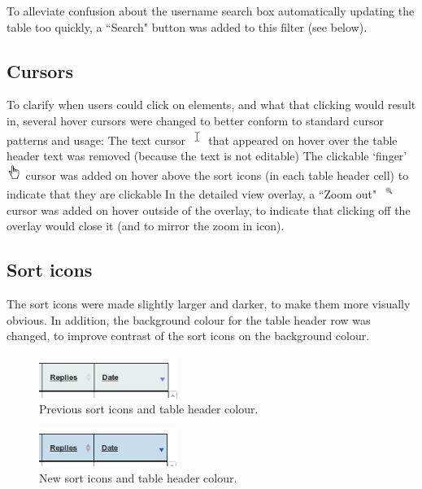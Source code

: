 To alleviate confusion about the username search box automatically updating the table too quickly, a ``Search" button was added to this filter (see below). 

\subsection{Cursors}
To clarify when users could click on elements, and what that clicking would result in, several hover cursors were changed to better conform to standard cursor patterns and usage:
The text cursor \includegraphics[width=0.5cm]{Figures/textcursor.png} that appeared on hover over the table header text was removed (because the text is not editable)
The clickable ‘finger’ \includegraphics[width=0.5cm]{Figures/handcursor.png} cursor was added on hover above the sort icons (in each table header cell) to indicate that they are clickable
In the detailed view overlay, a ``Zoom out"  \includegraphics[width=0.5cm]{Figures/V2/zoomout.png} cursor was added on hover outside of the overlay, to indicate that clicking off the overlay would close it (and to mirror the zoom in icon). 

\subsection{Sort icons}
The sort icons were made slightly larger and darker, to make them more visually obvious. In addition, the background colour for the table header row was changed, to improve contrast \citep[p. 650]{Galitz} of the sort icons on the background colour. 
\begin{figure}[h!]
    \centering
    \includegraphics[width=0.4\textwidth]{Figures/V2/oldsort.png}
 \caption{Previous sort icons and table header colour.}
\end{figure}

\begin{figure}[h!]
    \centering
    \includegraphics[width=0.4\textwidth]{Figures/V2/newsort.png}
 \caption{New sort icons and table header colour.}
\end{figure}

